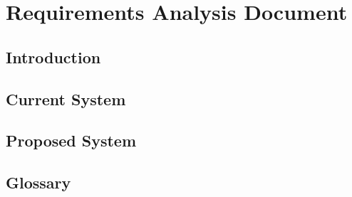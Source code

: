 


	\part*{Requirements Analysis Document}

	
	\newpage

	\tableofcontents* %
	\newpage

	\chapter{Introduction}
	
	\newpage

	\chapter{Current System}
	

	\chapter{Proposed System}
	

	\chapter{Glossary}
	

